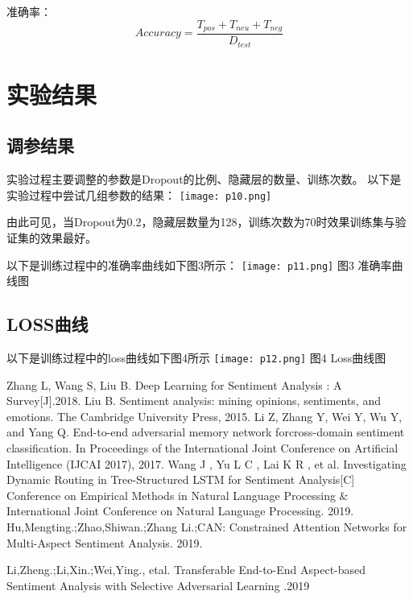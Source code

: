 \documentclass[twocolumn]{ctexart}
\begin{document}
准确率：\begin{equation}
Accuracy=\frac{T_{pos}+T_{neu}+T_{neg}}{D_{test}}
\end{equation}

\section{实验结果}
\subsection{调参结果}
\par 实验过程主要调整的参数是Dropout的比例、隐藏层的数量、训练次数。
以下是实验过程中尝试几组参数的结果：
\texttt{[image: p10.png]}
\par 由此可见，当Dropout为0.2，隐藏层数量为128，训练次数为70时效果训练集与验证集的效果最好。
\par 以下是训练过程中的准确率曲线如下图3所示：
\texttt{[image: p11.png]}
图3 准确率曲线图

\subsection{LOSS曲线}
\par 以下是训练过程中的loss曲线如下图4所示
\texttt{[image: p12.png]}
图4 Loss曲线图


\begin{thebibliography}{99}  
 Zhang L, Wang S, Liu B. Deep Learning for Sentiment Analysis : A Survey[J].2018.
 Liu  B.  Sentiment  analysis:  mining  opinions,  sentiments,  and  emotions.  The  Cambridge  University  Press, 2015.
Li  Z,  Zhang Y,  Wei  Y,  Wu  Y, and Yang  Q.  End-to-end  adversarial  memory  network  forcross-domain sentiment  classification.  In Proceedings  of  the  International  Joint  Conference  on  Artificial  Intelligence  (IJCAI 2017), 2017.  
Wang J , Yu L C , Lai K R , et al. Investigating Dynamic Routing in Tree-Structured LSTM for Sentiment Analysis[C] Conference on Empirical Methods in Natural Language Processing & International Joint Conference on Natural Language Processing. 2019.
 Hu,Mengting.;Zhao,Shiwan.;Zhang Li.;CAN: Constrained Attention Networks for Multi-Aspect Sentiment Analysis. 2019.

 Li,Zheng.;Li,Xin.;Wei,Ying., etal. Transferable End-to-End Aspect-based Sentiment Analysis with Selective Adversarial Learning .2019
\end{thebibliography}
\end{document}
